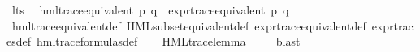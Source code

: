 \begin{isabellebody}
%
\endisadelimvisible
%
\begin{isamarkuptext}%
%
\end{isamarkuptext}\isamarkuptrue%
\isamarkupfalse%
\ lts\ \isanewline
\isanewline
{}\isamarkupfalse%
\ {\isachardoublequoteopen}hml{\isacharunderscore}{\kern0pt}trace{\isacharunderscore}{\kern0pt}equivalent\ p\ q\ {\isasymlongleftrightarrow}\ expr{\isacharunderscore}{\kern0pt}trace{\isacharunderscore}{\kern0pt}equivalent\ p\ q{\isachardoublequoteclose}\isanewline
%
\isadelimproof
\ \ %
\endisadelimproof
%
\isatagproof
{}\isamarkupfalse%
\ hml{\isacharunderscore}{\kern0pt}trace{\isacharunderscore}{\kern0pt}equivalent{\isacharunderscore}{\kern0pt}def\ HML{\isacharunderscore}{\kern0pt}subset{\isacharunderscore}{\kern0pt}equivalent{\isacharunderscore}{\kern0pt}def\ expr{\isacharunderscore}{\kern0pt}trace{\isacharunderscore}{\kern0pt}equivalent{\isacharunderscore}{\kern0pt}def\ expr{\isacharunderscore}{\kern0pt}traces{\isacharunderscore}{\kern0pt}def\ hml{\isacharunderscore}{\kern0pt}trace{\isacharunderscore}{\kern0pt}formulas{\isacharunderscore}{\kern0pt}def\isanewline
\ \ \isamarkupfalse%
\ HML{\isacharunderscore}{\kern0pt}trace{\isacharunderscore}{\kern0pt}lemma\ \isanewline
\ \ \isamarkupfalse%
\ blast%
\endisatagproof
{\isafoldproof}%
%
\isadelimproof
\isanewline
%
\endisadelimproof
\isanewline
{}\isamarkupfalse%
\isanewline
\isanewline
%
\isadelimproof
%
\endisadelimproof
%
\isatagproof
%
\endisatagproof
{\isafoldproof}%
%
\isadelimproof
%
\endisadelimproof
%
\isadelimproof
%
\endisadelimproof
%
\isatagproof
%
\endisatagproof
{\isafoldproof}%
%
\isadelimproof
%
\endisadelimproof
%
\isadelimproof
%
\endisadelimproof
%
\isatagproof
%
\endisatagproof
{\isafoldproof}%
%
\isadelimproof
\isanewline
%
\endisadelimproof
{}\isamarkupfalse%
\isanewline
%
\isadelimtheory
%
\endisadelimtheory
%
\isatagtheory
{}\isamarkupfalse%
%
\endisatagtheory
{\isafoldtheory}%
%
\isadelimtheory
%
\endisadelimtheory
%
\end{isabellebody}%
\endinput
